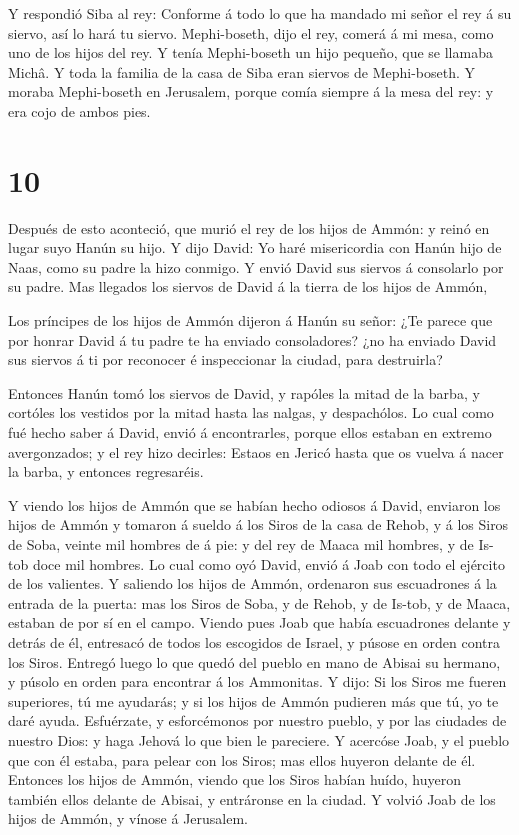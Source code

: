  Y respondió Siba al rey: Conforme á todo lo que ha mandado
mi señor el rey á su siervo, así lo hará tu siervo. Mephi-boseth, dijo
el rey, comerá á mi mesa, como uno de los hijos del rey.  Y
tenía Mephi-boseth un hijo pequeño, que se llamaba Michâ. Y toda la
familia de la casa de Siba eran siervos de Mephi-boseth.  Y
moraba Mephi-boseth en Jerusalem, porque comía siempre á la mesa del
rey: y era cojo de ambos pies.

\hypertarget{section-9}{%
\section{10}\label{section-9}}

 Después de esto aconteció, que murió el rey de los hijos de
Ammón: y reinó en lugar suyo Hanún su hijo.  Y dijo David:
Yo haré misericordia con Hanún hijo de Naas, como su padre la hizo
conmigo. Y envió David sus siervos á consolarlo por su padre. Mas
llegados los siervos de David á la tierra de los hijos de Ammón,

 Los príncipes de los hijos de Ammón dijeron á Hanún su
señor: ¿Te parece que por honrar David á tu padre te ha enviado
consoladores? ¿no ha enviado David sus siervos á ti por reconocer é
inspeccionar la ciudad, para destruirla?

 Entonces Hanún tomó los siervos de David, y rapóles la
mitad de la barba, y cortóles los vestidos por la mitad hasta las
nalgas, y despachólos.  Lo cual como fué hecho saber á
David, envió á encontrarles, porque ellos estaban en extremo
avergonzados; y el rey hizo decirles: Estaos en Jericó hasta que os
vuelva á nacer la barba, y entonces regresaréis.

 Y viendo los hijos de Ammón que se habían hecho odiosos á
David, enviaron los hijos de Ammón y tomaron á sueldo á los Siros de la
casa de Rehob, y á los Siros de Soba, veinte mil hombres de á pie: y del
rey de Maaca mil hombres, y de Is-tob doce mil hombres.  Lo
cual como oyó David, envió á Joab con todo el ejército de los valientes.
 Y saliendo los hijos de Ammón, ordenaron sus escuadrones á
la entrada de la puerta: mas los Siros de Soba, y de Rehob, y de Is-tob,
y de Maaca, estaban de por sí en el campo.  Viendo pues Joab
que había escuadrones delante y detrás de él, entresacó de todos los
escogidos de Israel, y púsose en orden contra los Siros. 
Entregó luego lo que quedó del pueblo en mano de Abisai su hermano, y
púsolo en orden para encontrar á los Ammonitas.  Y dijo: Si
los Siros me fueren superiores, tú me ayudarás; y si los hijos de Ammón
pudieren más que tú, yo te daré ayuda.  Esfuérzate, y
esforcémonos por nuestro pueblo, y por las ciudades de nuestro Dios: y
haga Jehová lo que bien le pareciere.  Y acercóse Joab, y
el pueblo que con él estaba, para pelear con los Siros; mas ellos
huyeron delante de él.  Entonces los hijos de Ammón, viendo
que los Siros habían huído, huyeron también ellos delante de Abisai, y
entráronse en la ciudad. Y volvió Joab de los hijos de Ammón, y vínose á
Jerusalem.


